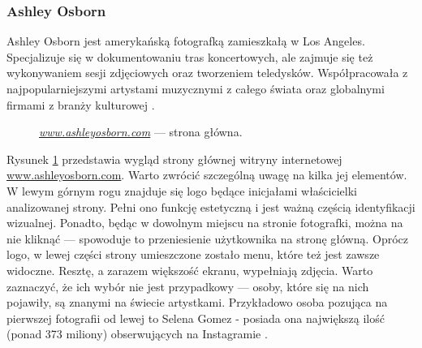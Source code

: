 \documentclass[12pt]{article}
\numberwithin{figure}{section}
\begin{document}
\begin{sloppypar}

\subsubsection{Ashley Osborn}

Ashley Osborn jest amerykańską fotografką zamieszkałą w Los Angeles. Specjalizuje się w dokumentowaniu tras koncertowych, ale zajmuje się też wykonywaniem sesji zdjęciowych oraz tworzeniem teledysków. Współpracowała z najpopularniejszymi artystami muzycznymi z całego świata oraz globalnymi firmami z branży kulturowej \cite{ashley}. 

\begin{figure}[H] 
    \centering
   \caption{\textit{\url{www.ashleyosborn.com}} --- strona główna.}
   \label{fig:ashley-1.jpg}
\end{figure}

Rysunek \ref{fig:ashley-1.jpg} przedstawia wygląd strony głównej witryny internetowej \url{www.ashleyosborn.com}. Warto zwrócić szczególną uwagę na kilka jej elementów. W lewym górnym rogu znajduje się logo będące inicjałami właścicielki analizowanej strony. Pełni ono funkcję estetyczną i jest ważną częścią identyfikacji wizualnej. Ponadto, będąc w dowolnym miejscu na stronie fotografki, można na nie kliknąć --- spowoduje to przeniesienie użytkownika na stronę główną. Oprócz logo, w lewej części strony umieszczone zostało menu, które też jest zawsze widoczne. Resztę, a zarazem większość ekranu, wypełniają zdjęcia. Warto zaznaczyć, że ich wybór nie jest przypadkowy --- osoby, które się na nich pojawiły, są znanymi na świecie artystkami. Przykładowo osoba pozująca na pierwszej fotografii od lewej to Selena Gomez - posiada ona największą ilość (ponad 373 miliony) obserwujących na Instagramie \cite{instagram}. 


\end{sloppypar}
\end{document}
